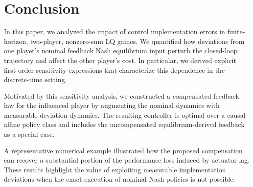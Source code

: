 \documentclass[letterpaper, 10 pt, conference]{ieeeconf}  %
\begin{document}
\section{Conclusion}
\label{sec: conclusion}
In this paper, we analyzed the impact of control implementation errors in finite-horizon, two-player, nonzero-sum LQ games. 
We quantified how deviations from one player’s nominal
feedback Nash equilibrium input perturb the closed-loop
trajectory and affect the other player’s cost. In particular,
we derived explicit first-order sensitivity expressions that
characterize this dependence in the discrete-time setting.


Motivated by this sensitivity analysis, we constructed a compensated feedback law for the influenced player by augmenting the nominal dynamics with measurable deviation dynamics. The resulting controller is optimal over a causal affine policy class and includes the uncompensated equilibrium-derived
feedback as a special case.

A representative numerical example illustrated how the proposed
compensation can recover a substantial portion of the performance
loss induced by actuator lag. These results highlight the value
of exploiting measurable implementation deviations when the
exact execution of nominal Nash policies is not possible.
\end{document}
